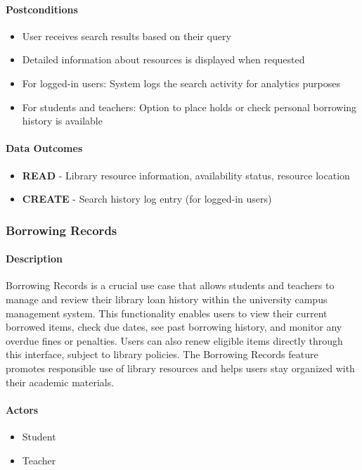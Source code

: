 \paragraph{Postconditions}
\begin{itemize}
    \item User receives search results based on their query
    \item Detailed information about resources is displayed when requested
    \item For logged-in users: System logs the search activity for analytics purposes
    \item For students and teachers: Option to place holds or check personal borrowing history is available
\end{itemize}

\paragraph{Data Outcomes}
\begin{itemize}
    \item \textbf{READ} - Library resource information, availability status, resource location
    \item \textbf{CREATE} - Search history log entry (for logged-in users)
\end{itemize}
\subsubsection{Borrowing Records}

\paragraph{Description}
Borrowing Records is a crucial use case that allows students and teachers to manage and review their library loan history within the university campus management system. This functionality enables users to view their current borrowed items, check due dates, see past borrowing history, and monitor any overdue fines or penalties. Users can also renew eligible items directly through this interface, subject to library policies. The Borrowing Records feature promotes responsible use of library resources and helps users stay organized with their academic materials.

\paragraph{Actors}
\begin{itemize}
    \item Student
    \item Teacher
\end{itemize}

